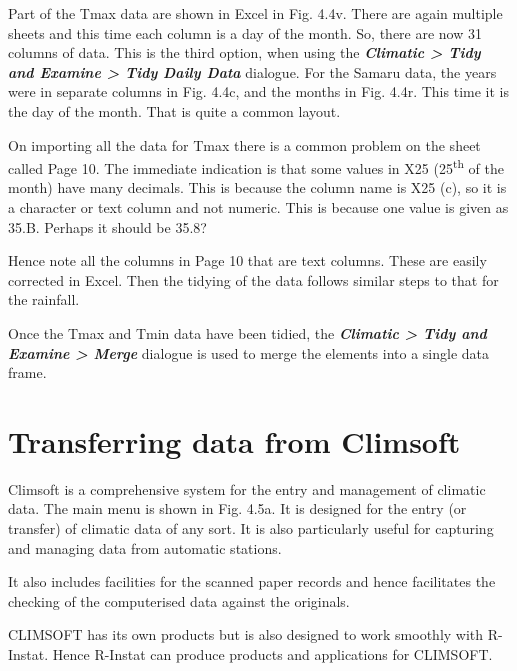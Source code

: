 \documentclass[
  letterpaper,
  DIV=11,
  numbers=noendperiod]{scrreprt}
\begin{document}
Part of the Tmax data are shown in Excel in Fig. 4.4v. There are again
multiple sheets and this time each column is a day of the month. So,
there are now 31 columns of data. This is the third option, when using
the \textbf{\emph{Climatic \textgreater{} Tidy and Examine
\textgreater{} Tidy Daily Data}} dialogue. For the Samaru data, the
years were in separate columns in Fig. 4.4c, and the months in Fig.
4.4r. This time it is the day of the month. That is quite a common
layout.

On importing all the data for Tmax there is a common problem on the
sheet called Page 10. The immediate indication is that some values in
X25 (25\textsuperscript{th} of the month) have many decimals. This is
because the column name is X25 (c), so it is a character or text column
and not numeric. This is because one value is given as 35.B. Perhaps it
should be 35.8?

Hence note all the columns in Page 10 that are text columns. These are
easily corrected in Excel. Then the tidying of the data follows similar
steps to that for the rainfall.

Once the Tmax and Tmin data have been tidied, the \textbf{\emph{Climatic
\textgreater{} Tidy and Examine \textgreater{} Merge}} dialogue is used
to merge the elements into a single data frame.

\section{Transferring data from
Climsoft}\label{transferring-data-from-climsoft}

Climsoft is a comprehensive system for the entry and management of
climatic data. The main menu is shown in Fig. 4.5a. It is designed for
the entry (or transfer) of climatic data of any sort. It is also
particularly useful for capturing and managing data from automatic
stations.

It also includes facilities for the scanned paper records and hence
facilitates the checking of the computerised data against the originals.

CLIMSOFT has its own products but is also designed to work smoothly with
R-Instat. Hence R-Instat can produce products and applications for
CLIMSOFT.
\end{document}
